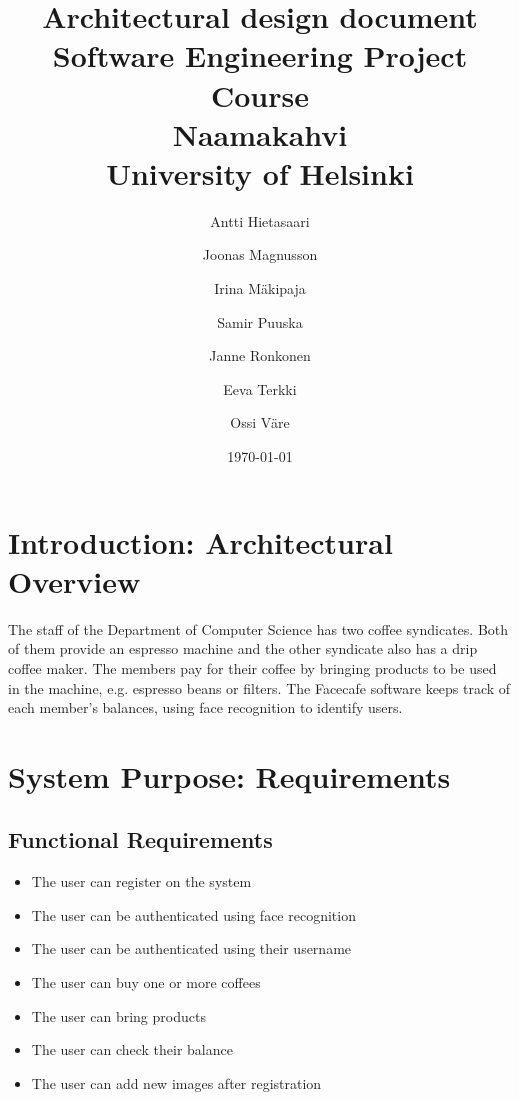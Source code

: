 \documentclass[11pt]{article}
\title{Architectural design document\\
  Software Engineering Project Course\\
  Naamakahvi\\
  University of Helsinki}
\author{Antti Hietasaari
  \and Joonas Magnusson
  \and Irina Mäkipaja
  \and Samir Puuska
  \and Janne Ronkonen
  \and Eeva Terkki
  \and Ossi Väre}
\date{\today}
\begin{document}
\maketitle

\tableofcontents



\section{Introduction: Architectural Overview}

The staff of the Department of Computer Science has two coffee syndicates. Both of them provide an espresso machine and the other syndicate also has a drip coffee maker. The members pay for their coffee by bringing products to be used in the machine, e.g. espresso beans or filters. The Facecafe software keeps track of each member’s balances, using face recognition to identify users.

\section{System Purpose: Requirements}


\subsection{Functional Requirements}

\begin{itemize}
\item{The user can register on the system}
\item{The user can be authenticated using face recognition}
\item{The user can be authenticated using their username}  
\item{The user can buy one or more coffees}
\item{The user can bring products}
\item{The user can check their balance}
\item{The user can add new images after registration}
\end{itemize}  
\end{document}
